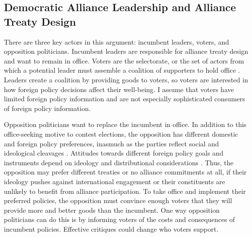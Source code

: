 \documentclass[12pt]{article}
\begin{document}
\subsection{Democratic Alliance Leadership and Alliance Treaty Design}


There are three key actors in this argument: incumbent leaders, voters, and opposition politicians.
Incumbent leaders are responsible for alliance treaty design and want to remain in office. 
Voters are the selectorate, or the set of actors from which a potential leader must assemble a coalition of supporters to hold office \citep{BDMetal2002}. 
Leaders create a coalition by providing goods to voters, so voters are interested in how foreign policy decisions affect their well-being.
I assume that voters have limited foreign policy information and are not especially sophisticated consumers of foreign policy information. 


Opposition politicians want to replace the incumbent in office. 
In addition to this office-seeking motive to contest elections, the opposition has different domestic and foreign policy preferences, inasmuch as the parties reflect social and ideological cleavages \citep{Leedsetal2009}. 
Attitudes towards different foreign policy goals and instruments depend on ideology and distributional considerations \citep{MilnerTingley2015, Fordham2019}. 
Thus, the opposition may prefer different treaties or no alliance commitments at all, if their ideology pushes against international engagement or their constituents are unlikely to benefit from alliance participation. 
To take office and implement their preferred policies, the opposition must convince enough voters that they will provide more and better goods than the incumbent. 
One way opposition politicians can do this is by informing voters of the costs and consequences of incumbent policies. 
Effective critiques could change who voters support. 
\end{document}

